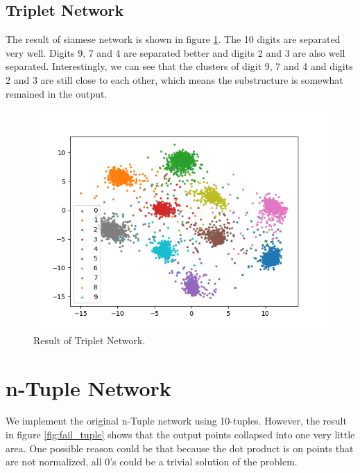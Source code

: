 \documentclass[10pt,twocolumn,letterpaper]{article}
\begin{document}
		\subsection{Triplet Network}
			The result of siamese network is shown in figure \ref{fig:triplet}. The 10 digits are separated very well. Digits 9, 7 and 4 are separated better and digits 2 and 3 are also well separated. Interestingly, we can see that the clusters of digit 9, 7 and 4 and digits 2 and 3 are still close to each other, which means the substructure is somewhat remained in the output.
			\begin{figure}[htbp]
				\begin{center}
					\includegraphics[width=0.9\linewidth]{triplet}
				\end{center}
				\caption{Result of Triplet Network.\label{fig:triplet}}
			\end{figure}
		\section{n-Tuple Network}
			We implement the original n-Tuple network using 10-tuples. However, the result in figure \ref{fig:fail_tuple} shows that the output points collapsed into one very little area.
			One possible reason could be that because the dot product is on points that are not normalized, all 0's could be a trivial solution of the problem.
			
\end{document}

